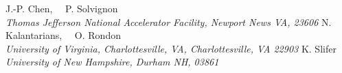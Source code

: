 \setcounter{footnote}{1}
{\n J.-P. Chen,~~ P. Solvignon\footnotemark
}\\
\ls
{\normalsize\it{Thomas Jefferson National Accelerator Facility, Newport News VA, 23606}}
\ks
%
%
%
N. Kalantarians,~~ O. Rondon\\
\ls
{\normalsize\it{University of Virginia, Charlottesville, VA, Charlottesville, VA 22903}}
\ks
{\n K. Slifer}\\
\ls
{\normalsize\it{University of New Hampshire, Durham NH, 03861}}
%
%
%
%
%
